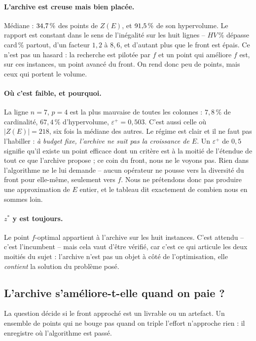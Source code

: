 \documentclass[11pt,a4paper]{article}
\theoremstyle{plain}
\theoremstyle{remark}
\begin{document}
\paragraph{L'archive est creuse mais bien placée.}
Médiane : $34{,}7{}\,\%$ des points de $Z(E)$, et $91{,}5{}\,\%$ de son
hypervolume. Le rapport est constant dans le sens de l'inégalité sur les
huit lignes -- $HV\,\%$ dépasse card\,\% partout, d'un facteur $1{,}2$ à
$8{,}6$, et d'autant plus que le front est épais. Ce n'est pas un hasard : la recherche est pilotée par $f$ et un point
qui améliore $f$ est, sur ces instances, un point avancé du front. On rend
donc peu de points, mais ceux qui portent le volume.

\paragraph{Où c'est faible, et pourquoi.}
La ligne $n=7$, $p=4$ est la plus mauvaise de toutes les colonnes :
$7{,}8\,\%$ de cardinalité, $67{,}4\,\%$ d'hypervolume, $\varepsilon^+ =
0{,}503$. C'est aussi celle où $|Z(E)| = 218$, six fois la médiane des
autres. Le régime est clair et il ne faut pas l'habiller : \emph{à budget
fixe, l'archive ne suit pas la croissance de $E$}. Un $\varepsilon^+$ de
$0{,}5$ signifie qu'il existe un point efficace dont un critère est à la
moitié de l'étendue de tout ce que l'archive propose ; ce coin du front,
nous ne le voyons pas. Rien dans l'algorithme ne le lui demande -- aucun
opérateur ne pousse vers la diversité du front pour elle-même, seulement
vers $f$. Nous ne prétendons donc pas produire une approximation de $E$
entier, et le tableau dit exactement de combien nous en sommes loin.

\paragraph{$z^\ast$ y est toujours.}
Le point $f$-optimal appartient à l'archive sur les huit instances. C'est
attendu -- c'est l'incumbent -- mais cela vaut d'être vérifié, car c'est ce
qui articule les deux moitiés du sujet : l'archive n'est pas un objet à côté
de l'optimisation, elle \emph{contient} la solution du problème posé.

\subsection{L'archive s'améliore-t-elle quand on paie ?}

La question décide si le front approché est un livrable ou un artefact. Un
ensemble de points qui ne bouge pas quand on triple l'effort n'approche
rien : il enregistre où l'algorithme est passé.
\end{document}
